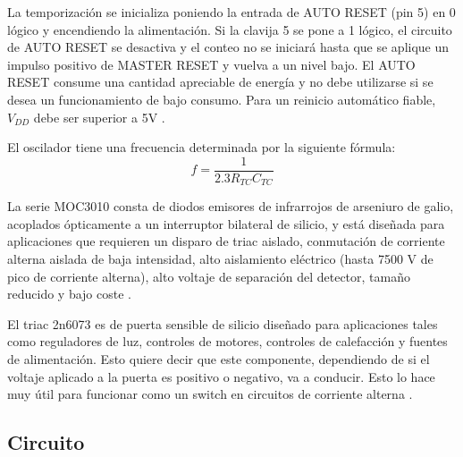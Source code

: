La temporización se inicializa poniendo la entrada de AUTO RESET (pin 5) en 0 lógico y encendiendo la alimentación. Si la clavija 5 se pone a 1 lógico, el circuito de AUTO RESET se desactiva y el conteo no se iniciará hasta que se aplique un impulso positivo de MASTER RESET y vuelva a un nivel bajo.  El AUTO RESET consume una cantidad apreciable de energía y no debe utilizarse si se desea un funcionamiento de bajo consumo. Para un reinicio automático fiable, $V_{DD}$ debe ser superior a 5V \parencite{texas_instruments_cd4541_nodate}.

El oscilador tiene una frecuencia determinada por la siguiente fórmula:
\begin{equation}
    f = \frac{1}{2.3 R_{TC} C_{TC}}
\end{equation}

La serie MOC3010 consta de diodos emisores de infrarrojos de arseniuro de galio, acoplados ópticamente a un interruptor bilateral de silicio, y está diseñada para aplicaciones que requieren un disparo de triac aislado, conmutación de corriente alterna aislada de baja intensidad, alto aislamiento eléctrico (hasta 7500 V de pico de corriente alterna), alto voltaje de separación del detector, tamaño reducido y bajo coste \parencite{motorola_moc3011_nodate}.

El triac 2n6073 es de puerta sensible de silicio diseñado para aplicaciones tales como reguladores de luz, controles de motores, controles de calefacción y fuentes de alimentación. Esto quiere decir que este componente, dependiendo de si el voltaje aplicado a la puerta es positivo o negativo, va a conducir. Esto lo hace muy útil para funcionar como un switch en circuitos de corriente alterna \parencite{central_semiconductor_corp_2n6073_nodate}.

\subsection{Circuito}

